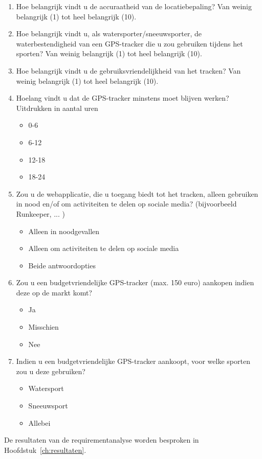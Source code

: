 \begin{enumerate}
	\item Hoe belangrijk vindt u de accuraatheid van de locatiebepaling? Van weinig belangrijk (1) tot heel belangrijk (10).
	\item Hoe belangrijk vindt u, als watersporter/sneeuwsporter, de waterbestendigheid van een GPS-tracker die u zou gebruiken tijdens het sporten? Van weinig belangrijk (1) tot heel belangrijk (10).
	\item Hoe belangrijk vindt u de gebruiksvriendelijkheid van het tracken? Van weinig belangrijk (1) tot heel belangrijk (10).
	\item Hoelang vindt u dat de GPS-tracker minstens moet blijven werken? Uitdrukken in aantal uren
		\begin{itemize}
			\item 0-6
			\item 6-12
			\item 12-18
			\item 18-24
		\end{itemize}
	\item Zou u de webapplicatie, die u toegang biedt tot het tracken, alleen gebruiken in nood en/of om activiteiten te delen op sociale media? (bijvoorbeeld Runkeeper, ... )
		\begin{itemize}
			\item Alleen in noodgevallen
			\item Alleen om activiteiten te delen op sociale media
			\item Beide antwoordopties
		\end{itemize}
	\item  Zou u een budgetvriendelijke GPS-tracker (max. 150 euro) aankopen indien deze op de markt komt?
		\begin{itemize}
			\item Ja
			\item Misschien
			\item Nee
		\end{itemize}
	\item Indien u een budgetvriendelijke GPS-tracker aankoopt, voor welke sporten zou u deze gebruiken?
		\begin{itemize}
			\item Watersport
			\item Sneeuwsport
			\item Allebei
		\end{itemize}

\end{enumerate}
De resultaten van de requirementanalyse worden besproken in Hoofdstuk~\ref{ch:resultaten}.



